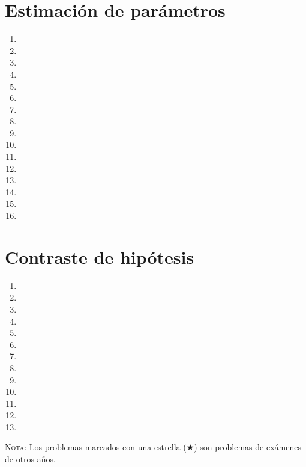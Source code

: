 \documentclass[a4paper,titlepage]{article}
\begin{document}
\section{Estimación de parámetros}
\begin{enumerate}[leftmargin=*,resume]
\item {}
\item {}
\item {}
\item {}
\item {}
\item {}
\item {}
\item {}
\item {}
\item {}
\item {}
\item {}
\item {}
\item {}
\item {}
\item {}
\end{enumerate}


\section{Contraste de hipótesis}
\begin{enumerate}[leftmargin=*,resume]
\item {}
\item {}
\item {}
\item {}
\item {}
\item {}
\item {}
\item {}
\item {}
\item {}
\item {}
\item {}
\item {}
\end{enumerate} 

\vspace{2cm} 

\textsc{Nota}: Los problemas marcados con una estrella ($\bigstar$) son problemas de
exámenes de otros años.
\end{document}
